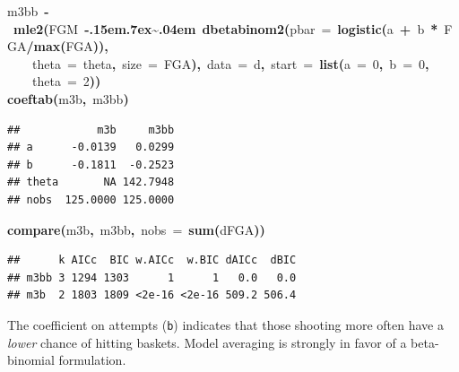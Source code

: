 \documentclass{article}
\makeatletter
\newcommand{\hlnumber}[1]{\textcolor[rgb]{0,0,0}{#1}}%
\newcommand{\hlfunctioncall}[1]{\textcolor[rgb]{.5,0,.33}{\textbf{#1}}}%
\newcommand{\hlkeyword}[1]{\textbf{#1}}%
\newcommand{\hlargument}[1]{\textcolor[rgb]{.69,.25,.02}{#1}}%
\newcommand{\hlassignement}[1]{\textbf{#1}}%
\newcommand{\hlsymbol}[1]{#1}%
\def\urltilda{\kern -.15em\lower .7ex\hbox{\~{}}\kern .04em}%
\newcommand{\hlstd}[1]{\textcolor[rgb]{0,0,0}{#1}}%
\newenvironment{kframe}{%
 \def\FrameCommand##1{\hskip\@totalleftmargin \hskip-\fboxsep
 \colorbox{shadecolor}{##1}\hskip-\fboxsep
     \hskip-\linewidth \hskip-\@totalleftmargin \hskip\columnwidth}%
 \MakeFramed {\advance\hsize-\width
   \@totalleftmargin\z@ \linewidth\hsize
   \@setminipage}}%
 {\par\unskip\endMakeFramed}
\newenvironment{knitrout}{}{} %
\makeatother
\begin{document}
\begin{knitrout}
{\begin{kframe}
\begin{flushleft}
\hlstd{}\hlsymbol{m3bb}{\ }\hlassignement{\usebox{\hlnormalsizeboxlessthan}-}{\ }\hlfunctioncall{mle2}\hlkeyword{(}\hlsymbol{FGM}{\ }\hlkeyword{\urltilda{}}{\ }\hlfunctioncall{dbetabinom2}\hlkeyword{(}\hlargument{pbar}{\ }\hlargument{=}{\ }\hlfunctioncall{logistic}\hlkeyword{(}\hlsymbol{a}{\ }\hlkeyword{+}{\ }\hlsymbol{b}{\ }\hlkeyword{*}{\ }\hlsymbol{FGA}\hlkeyword{/}\hlfunctioncall{max}\hlkeyword{(}\hlsymbol{FGA}\hlkeyword{)}\hlkeyword{)}\hlkeyword{,}\hspace*{\fill}\\
\hlstd{}{\ }{\ }{\ }{\ }\hlargument{theta}{\ }\hlargument{=}{\ }\hlsymbol{theta}\hlkeyword{,}{\ }\hlargument{size}{\ }\hlargument{=}{\ }\hlsymbol{FGA}\hlkeyword{)}\hlkeyword{,}{\ }\hlargument{data}{\ }\hlargument{=}{\ }\hlsymbol{d}\hlkeyword{,}{\ }\hlargument{start}{\ }\hlargument{=}{\ }\hlfunctioncall{list}\hlkeyword{(}\hlargument{a}{\ }\hlargument{=}{\ }\hlnumber{0}\hlkeyword{,}{\ }\hlargument{b}{\ }\hlargument{=}{\ }\hlnumber{0}\hlkeyword{,}\hspace*{\fill}\\
\hlstd{}{\ }{\ }{\ }{\ }\hlargument{theta}{\ }\hlargument{=}{\ }\hlnumber{2}\hlkeyword{)}\hlkeyword{)}\hspace*{\fill}\\
\hlstd{}\hlfunctioncall{coeftab}\hlkeyword{(}\hlsymbol{m3b}\hlkeyword{,}{\ }\hlsymbol{m3bb}\hlkeyword{)}\mbox{}
\normalfont
\end{flushleft}
\begin{verbatim}
##            m3b     m3bb
## a      -0.0139   0.0299
## b      -0.1811  -0.2523
## theta       NA 142.7948
## nobs  125.0000 125.0000
\end{verbatim}
\begin{flushleft}
\ttfamily\noindent
\hlfunctioncall{compare}\hlkeyword{(}\hlsymbol{m3b}\hlkeyword{,}{\ }\hlsymbol{m3bb}\hlkeyword{,}{\ }\hlargument{nobs}{\ }\hlargument{=}{\ }\hlfunctioncall{sum}\hlkeyword{(}\hlsymbol{d}\hlkeyword{\usebox{\hlnormalsizeboxdollar}}\hlsymbol{FGA}\hlkeyword{)}\hlkeyword{)}\mbox{}
\normalfont
\end{flushleft}
\begin{verbatim}
##      k AICc  BIC w.AICc  w.BIC dAICc  dBIC
## m3bb 3 1294 1303      1      1   0.0   0.0
## m3b  2 1803 1809 <2e-16 <2e-16 509.2 506.4
\end{verbatim}
\end{kframe}}
\end{knitrout}


The coefficient on attempts ({\tt b}) indicates that those shooting more often have a {\em lower} chance of hitting baskets. 
Model averaging is strongly in favor of a beta-binomial formulation. 
\end{document}
